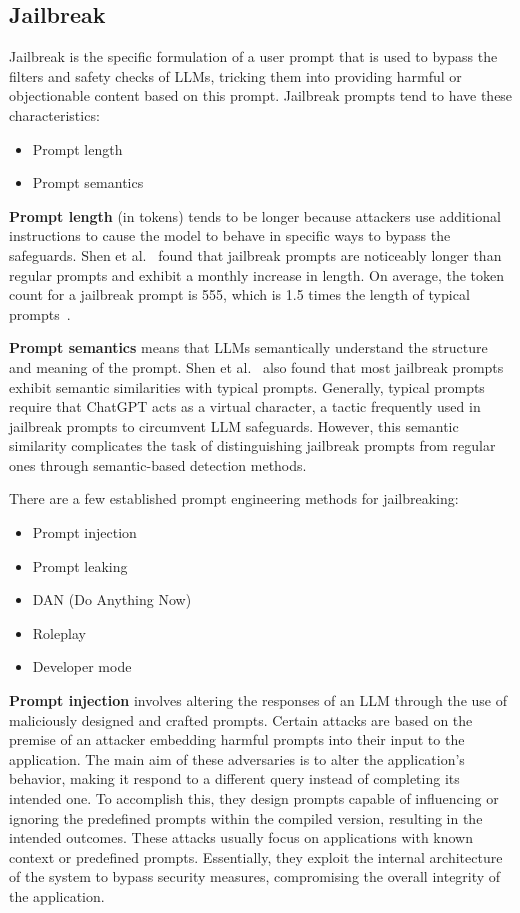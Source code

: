 \subsection{Jailbreak \label{sec:jailbreak}}
Jailbreak is the specific formulation of a user prompt that is used to bypass the filters and safety checks of LLMs, tricking them into providing harmful or objectionable content based on this prompt.
Jailbreak prompts tend to have these characteristics:
\begin{itemize}
    \item Prompt length
    \item Prompt semantics
\end{itemize}

\textbf{Prompt length} (in tokens) tends to be longer because attackers use additional instructions to cause the model to behave in specific ways to bypass the safeguards.
Shen et al.~\cite{shen2024donowcharacterizingevaluating} found that jailbreak prompts are noticeably longer than regular prompts and exhibit a monthly increase in length. On average, the token count for a jailbreak prompt is 555, which is 1.5 times the length of typical prompts~\cite{shen2024donowcharacterizingevaluating}.

\textbf{Prompt semantics} means that LLMs semantically understand the structure and meaning of the prompt. Shen et al.~\cite{shen2024donowcharacterizingevaluating} also found that most jailbreak prompts exhibit semantic similarities with typical prompts. Generally, typical prompts require that ChatGPT acts as a virtual character, a tactic frequently used in jailbreak prompts to circumvent LLM safeguards. However, this semantic similarity complicates the task of distinguishing jailbreak prompts from regular ones through semantic-based detection methods.~\cite{shen2024donowcharacterizingevaluating}

There are a few established prompt engineering methods for jailbreaking:
\begin{itemize}
    \item Prompt injection
    \item Prompt leaking
    \item DAN (Do Anything Now)
    \item Roleplay
    \item Developer mode
\end{itemize}

\textbf{Prompt injection} involves altering the responses of an LLM through the use of maliciously designed and crafted prompts. Certain attacks are based on the premise of an attacker embedding harmful prompts into their input to the application. The main aim of these adversaries is to alter the application's behavior, making it respond to a different query instead of completing its intended one. To accomplish this, they design prompts capable of influencing or ignoring the predefined prompts within the compiled version, resulting in the intended outcomes. These attacks usually focus on applications with known context or predefined prompts. Essentially, they exploit the internal architecture of the system to bypass security measures, compromising the overall integrity of the application.~\cite{liu2024promptinjectionattackllmintegrated}

